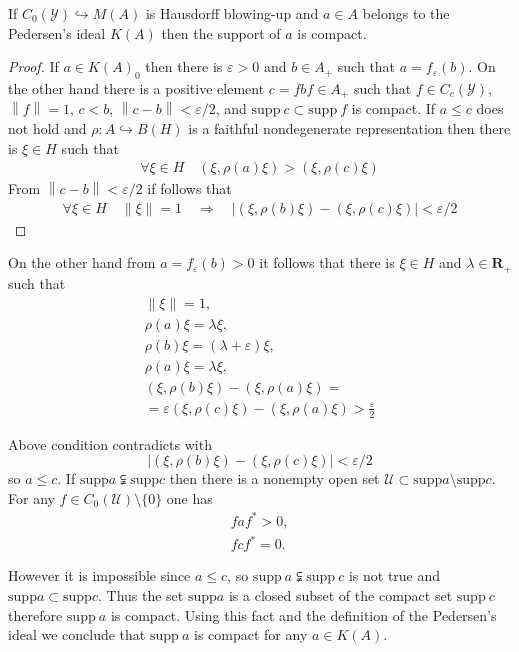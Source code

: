 \documentclass{beamer}
\theoremstyle{plain}
\newcommand{\eps}{\varepsilon}                    %
\newcommand{\supp}{\mathrm{supp}}
\newcommand{\sU}{\mathcal{U}}       %
\newcommand{\sY}{\mathcal{Y}}       %
\newcommand{\la}{\lambda}
\newcommand{\bean}{\begin{eqnarray*}}
\newcommand{\eean}{\end{eqnarray*}}
\newcommand{\hookto}{\hookrightarrow}        %
\begin{document}
\begin{frame}
	\begin{lemma}\label{blowing_pedersen_compact_lem}
		If  $C_0\left( \sY\right)\hookto M\left( A\right)$ is Hausdorff blowing-up and $a\in A$ belongs to the Pedersen's ideal $K\left(A \right)$  then the support of $a$  is compact.
	\end{lemma}
\begin{proof}	
If $a \in K\left(A\right)_0$  then  there is $\eps > 0$ and $b \in A_+$ such that $a = f_\eps \left( b\right)$. On the other hand  there is a positive element  $c= fbf\in  A_+$  such that  $f\in C_c\left(\sY \right)$, $\left\|f \right\|=1 $, $c < b$, $\left\|c - b \right\|  < \eps/2$, and $\supp~ c\subset \supp ~f$ is compact.
If $a \le c$ does not hold and $\rho: A \hookto B\left(H \right)$ is a faithful  nondegenerate representation  then there is $\xi \in H$ such that
\bean
\forall \xi \in H \quad \left( \xi, \rho\left( a \right) \xi\right) > \left( \xi, \rho\left( c \right) \xi\right)
\eean
From $\left\|c - b \right\|  < \eps/2$ if follows that
\bean
\forall \xi \in H  \quad \left\| \xi \right\| = 1\quad \Rightarrow\quad  \left|\left( \xi, \rho\left( b \right) \xi\right)-\left( \xi, \rho\left( c \right) \xi\right) \right| < \eps/2
\eean
\end{proof}

\end{frame}
\begin{frame}
On the other hand from $a =f_\eps \left( b\right)> 0$ it follows that there is $\xi \in H$ and $\la \in \mathbf{R}_+$ such that
\bean
\left\| \xi \right\| = 1,\\
\rho\left(a \right) \xi = \la \xi,\\
\rho\left(b \right)\xi = \left( \la+\eps \right) \xi,\\
\rho\left(a \right)\xi = \la  \xi,\\
\left( \xi, \rho\left( b \right) \xi\right) - \left( \xi, \rho\left( a \right) \xi\right)= \\=\eps
\left( \xi, \rho\left( c \right) \xi\right)- \left( \xi, \rho\left( a \right) \xi\right)> \frac{\eps}{2}
\eean

Above condition contradicts with
$$
\left|\left( \xi, \rho\left( b \right) \xi\right)-\left( \xi, \rho\left( c \right) \xi\right) \right| < \eps/2
$$
so $a \le c$.
If $\supp a \subsetneqq \supp c$ then there is a nonempty  open set  $\sU \subset \supp a\setminus \supp c$. For any $f \in C_0\left(\sU \right)\setminus \{0\}$ one has
\bean
faf^* > 0,\\
fcf^* = 0.
\eean
\end{frame}
\begin{frame}
However it is impossible since $a \le c$, so $\supp~ a \subsetneqq \supp ~c$ is not true and $\supp a \subset\supp c$. Thus the set $\supp a$ is a closed subset of the compact set $\supp~ c$ therefore $\supp~ a$ is compact. Using this fact and the definition of the Pedersen's ideal we conclude that $\supp~ a$ is compact for any $a \in K\left( A\right)$. 
	
	
\end{frame}
\end{document}
